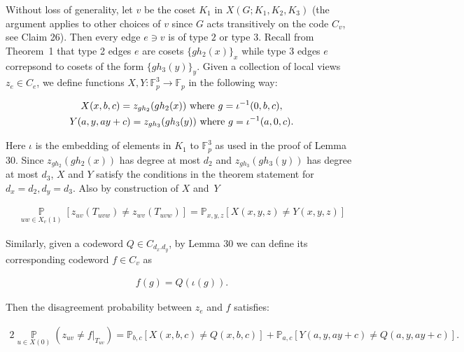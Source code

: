 \documentclass[10pt,a4paper]{article}
\begin{document}
Without loss of generality, let $v$ be the coset $K_{1}$ in $X(G;K_{1},K_{2},K_{3})$ (the argument applies to other choices of $v$ since $G$ acts transitively on the code $C_{v}$, see Claim 26).
Then every edge $e\ni v$ is of type $2$ or type $3$. Recall from Theorem 1 that type 2 edges $e$ are cosets $\{gh_{2}(x)\}_{x}$ while type 3 edges $e$ correpsond to cosets of the form $\{gh_{3}(y)\}_{y}$.
Given a collection of local views $z_{e}\in C_{e}$, we define functions $X,Y:\mathbb{F}_{p}^{3}\to\mathbb{F}_{p}$ in the following way:\par


\[\begin{gathered}
\displaystyle X(x,b,c)=z_{gh_{2}}(gh_{2}(x))\nobreak\ \text{where }g=\iota^{-1}(0,b,c), \\
\displaystyle Y(a,y,ay+c)=z_{gh_{3}}(gh_{3}(y))\nobreak\ \text{where }g=\iota^{-1}(a,0,c).
\end{gathered}\]


Here $\iota$ is the embedding of elements in $K_{1}$ to $\mathbb{F}_{p}^{3}$ as used in the proof of Lemma 30. Since $z_{gh_{2}}(gh_{2}(x))$ has degree at most $d_{2}$ and $z_{gh_{3}}(gh_{3}(y))$ has degree at most $d_{3}$, $X$ and $Y$ satisfy the conditions in the theorem statement for $d_{x}=d_{2},d_{y}=d_{3}$. Also by construction of $X$ and $Y$\par


\[\begin{gathered}
\displaystyle\operatorname*{\mathbb{P}}_{uw\in X_{v}(1)}[z_{uv}(T_{uvw})\neq z_{wv}(T_{uvw})]=\mathbb{P}_{x,y,z}[X(x,y,z)\not=Y(x,y,z)]
\end{gathered}\]




Similarly, given a codeword $Q\in C_{d_{x}.d_{y}}$, by Lemma 30 we can define its corresponding codeword $f\in C_{v}$ as\par


\[\begin{gathered}
f(g)=Q(\iota(g)).
\end{gathered}\]


Then the disagreement probability between $z_{e}$ and $f$ satisfies:\par


\[\begin{gathered}
2\operatorname*{\mathbb{P}}_{u\in X(0)}(z_{uv}\neq f|_{T_{uv}})=\mathbb{P}_{b,c}[X(x,b,c)\not=Q(x,b,c)]+\mathbb{P}_{a,c}[Y(a,y,ay+c)\not=Q(a,y,ay+c)].
\end{gathered}\]
\end{document}
